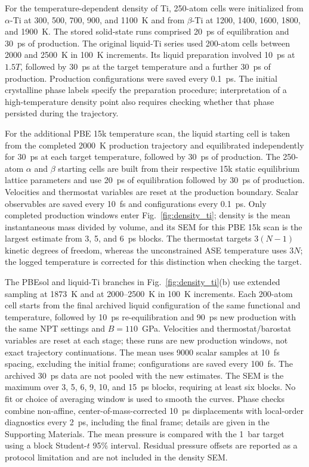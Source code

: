 For the temperature-dependent density of Ti, 250-atom cells were initialized from $\alpha$-Ti at 300, 500, 700, 900, and 1100~K and from $\beta$-Ti at 1200, 1400, 1600, 1800, and 1900~K.
The stored solid-state runs comprised 20~ps of equilibration and 30~ps of production.
The original liquid-Ti series used 200-atom cells between 2000 and 2500~K in 100~K increments.
Its liquid preparation involved 10~ps at $1.5T$, followed by 30~ps at the target temperature and a further 30~ps of production.
Production configurations were saved every 0.1~ps.
The initial crystalline phase labels specify the preparation procedure; interpretation of a high-temperature density point also requires checking whether that phase persisted during the trajectory.

For the additional PBE 15k temperature scan, the liquid starting cell is taken from the completed 2000~K production trajectory and equilibrated independently for 30~ps at each target temperature, followed by 30~ps of production.
The 250-atom $\alpha$ and $\beta$ starting cells are built from their respective 15k static equilibrium lattice parameters and use 20~ps of equilibration followed by 30~ps of production.
Velocities and thermostat variables are reset at the production boundary. Scalar observables are saved every 10~fs and configurations every 0.1~ps.
Only completed production windows enter Fig.~\ref{fig:density_ti}; density is the mean instantaneous mass divided by volume, and its SEM for this PBE 15k scan is the largest estimate from 3, 5, and 6~ps blocks.
The thermostat targets $3(N-1)$ kinetic degrees of freedom, whereas the unconstrained ASE temperature uses $3N$; the logged temperature is corrected for this distinction when checking the target.

The PBEsol and \rscan{} liquid-Ti branches in Fig.~\ref{fig:density_ti}(b) use extended sampling at 1873~K and at 2000--2500~K in 100~K increments.
Each 200-atom cell starts from the final archived liquid configuration of the same functional and temperature, followed by 10~ps re-equilibration and 90~ps new production with the same NPT settings and $B=110$~GPa.
Velocities and thermostat/barostat variables are reset at each stage; these runs are new production windows, not exact trajectory continuations.
The mean uses 9000 scalar samples at 10~fs spacing, excluding the initial frame; configurations are saved every 100~fs. The archived 30~ps data are not pooled with the new estimates.
The SEM is the maximum over 3, 5, 6, 9, 10, and 15~ps blocks, requiring at least six blocks. No fit or choice of averaging window is used to smooth the curves.
Phase checks combine non-affine, center-of-mass-corrected 10~ps displacements with local-order diagnostics every 2~ps, including the final frame; details are given in the Supporting Materials.
The mean pressure is compared with the 1~bar target using a block Student-$t$ 95\% interval. Residual pressure offsets are reported as a protocol limitation and are not included in the density SEM.


